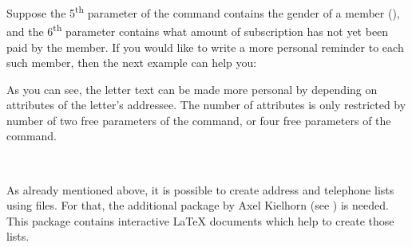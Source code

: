 \begin{Example}
  Suppose the 5\textsuperscript{th} parameter of the 
  command contains the gender of a member (), and the
  6\textsuperscript{th} parameter contains what amount of subscription
  has not yet been paid by the member. If you would like to write a
  more personal reminder to each such member, then the next example
  can help you:
\begin{lstcode}
  \renewcommand*{\adrentry}[8]{
    \ifdim #6pt>0pt\relax
      \begin{letter}{#2 #1\\#3}
        \if #5m \opening{Dear Mr.\,#2,} \fi
        \if #5f \opening{Dear Mrs.\,#2,} \fi

        Unfortunately we have to remind you that you have
        still not paid the member subscription for this
        year.

        Please remit EUR #6 to the account of the society.
       \closing{Regards,}
      \end{letter}
     \fi
  }
\end{lstcode}
\end{Example}
As you can see, the letter text can be made more personal by depending on
attributes of the letter's addressee.  The number of attributes is only
restricted by number of two free parameters of the  command,
or four free parameters of the  command.


\begin{Declaration}
  \\
\end{Declaration}
%
%
%
As already mentioned above, it is possible to create address and telephone
lists using  files.  For that, the additional package
 by Axel Kielhorn (see \cite{package:adrconv}) is needed.
This package contains interactive {\LaTeX} documents which help to create
those lists.

